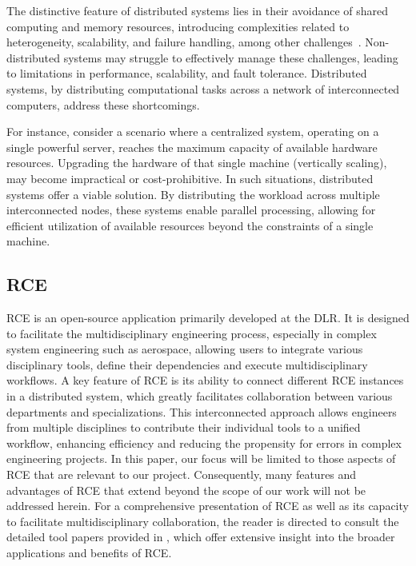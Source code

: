 The distinctive feature of distributed systems lies in their avoidance of shared computing and memory resources, introducing complexities related to heterogeneity, scalability, and failure handling, among other challenges~\cite{coulouris2005distributed}. Non-distributed systems may struggle to effectively manage these challenges, leading to limitations in performance, scalability, and fault tolerance. Distributed systems, by distributing computational tasks across a network of interconnected computers, address these shortcomings.

For instance, consider a scenario where a centralized system, operating on a single powerful server, reaches the maximum capacity of available hardware resources. Upgrading the hardware of that single machine (vertically scaling), may become impractical or cost-prohibitive. In such situations, distributed systems offer a viable solution. By distributing the workload across multiple interconnected nodes, these systems enable parallel processing, allowing for efficient utilization of available resources beyond the constraints of a single machine. 

\subsection{\acl{RCE}}
\label{subsec:rce}

\ac{RCE} is an open-source application primarily developed at the \ac{DLR}. It is designed to facilitate the multidisciplinary engineering process, especially in complex system engineering such as aerospace, allowing users to integrate various disciplinary tools, define their dependencies and execute multidisciplinary workflows\cite{BODEN2021100759}. A key feature of \ac{RCE} is its ability to connect different \ac{RCE} instances in a distributed system, which greatly facilitates collaboration between various departments and specializations. This interconnected approach allows engineers from multiple disciplines to contribute their individual tools to a unified workflow, enhancing efficiency and reducing the propensity for errors in complex engineering projects. In this paper, our focus will be limited to those aspects of \ac{RCE} that are relevant to our project. Consequently, many features and advantages of \ac{RCE} that extend beyond the scope of our work will not be addressed herein. For a comprehensive presentation of \ac{RCE} as well as its capacity to facilitate multidisciplinary collaboration, the reader is directed to consult the detailed tool papers provided in \cite{BODEN2021100759,boden2019distributed}, which offer extensive insight into the broader applications and benefits of \ac{RCE}.